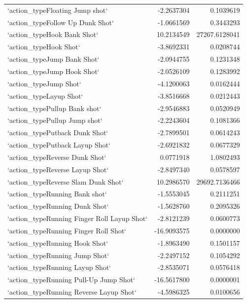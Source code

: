 \documentclass[american,]{article}
\begin{document}
\begin{longtable}{lrr}
\addlinespace
\rowcolor{gray!6}  `action\_typeFloating Jump shot` & -2.2637304 & 0.1039619\\
`action\_typeFollow Up Dunk Shot` & -1.0661569 & 0.3443293\\
\rowcolor{gray!6}  `action\_typeHook Bank Shot` & 10.2134549 & 27267.6128041\\
`action\_typeHook Shot` & -3.8692331 & 0.0208744\\
\rowcolor{gray!6}  `action\_typeJump Bank Shot` & -2.0944755 & 0.1231348\\
\addlinespace
`action\_typeJump Hook Shot` & -2.0526109 & 0.1283992\\
\rowcolor{gray!6}  `action\_typeJump Shot` & -4.1200063 & 0.0162444\\
`action\_typeLayup Shot` & -3.8516668 & 0.0212443\\
\rowcolor{gray!6}  `action\_typePullup Bank shot` & -2.9546883 & 0.0520949\\
`action\_typePullup Jump shot` & -2.2243604 & 0.1081366\\
\addlinespace
\rowcolor{gray!6}  `action\_typePutback Dunk Shot` & -2.7899501 & 0.0614243\\
`action\_typePutback Layup Shot` & -2.6921832 & 0.0677329\\
\rowcolor{gray!6}  `action\_typeReverse Dunk Shot` & 0.0771918 & 1.0802493\\
`action\_typeReverse Layup Shot` & -2.8497340 & 0.0578597\\
\rowcolor{gray!6}  `action\_typeReverse Slam Dunk Shot` & 10.2986570 & 29692.7136466\\
\addlinespace
`action\_typeRunning Bank shot` & -1.5553045 & 0.2111251\\
\rowcolor{gray!6}  `action\_typeRunning Dunk Shot` & -1.5628760 & 0.2095326\\
`action\_typeRunning Finger Roll Layup Shot` & -2.8121239 & 0.0600773\\
\rowcolor{gray!6}  `action\_typeRunning Finger Roll Shot` & -16.9093575 & 0.0000000\\
`action\_typeRunning Hook Shot` & -1.8963490 & 0.1501157\\
\addlinespace
\rowcolor{gray!6}  `action\_typeRunning Jump Shot` & -2.2497152 & 0.1054292\\
`action\_typeRunning Layup Shot` & -2.8535071 & 0.0576418\\
\rowcolor{gray!6}  `action\_typeRunning Pull-Up Jump Shot` & -16.5617800 & 0.0000001\\
`action\_typeRunning Reverse Layup Shot` & -4.5986325 & 0.0100656\\

\end{longtable}
\end{document}
